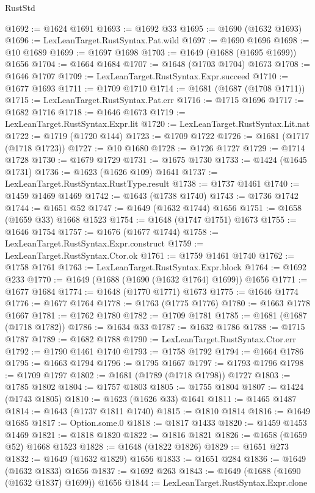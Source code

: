 \begin{lexlean}{RustStd}
\begin{coremodule}
{\begin{coremodule}
{{{{{{{{{{{{{{{{{{{{{{{{{{{{{{{{{{{{{{{{{{{{@1692 := @1624 @1691
@1693 := @1692 @33
@1695 := @1690 (@1632 @1693)
@1696 := LexLeanTarget.RustSyntax.Pat.wild
@1697 := @1690 @1696
@1698 := @10 @1689
@1699 := @1697 @1698
@1703 := @1649 (@1688 (@1695 @1699)) @1656
@1704 := @1664 @1684
@1707 := @1648 (@1703 @1704) @1673
@1708 := @1646 @1707
@1709 := LexLeanTarget.RustSyntax.Expr.succeed
@1710 := @1677 @1693
@1711 := @1709 @1710
@1714 := @1681 (@1687 (@1708 @1711))
@1715 := LexLeanTarget.RustSyntax.Pat.err
@1716 := @1715 @1696
@1717 := @1682 @1716
@1718 := @1646 @1673
@1719 := LexLeanTarget.RustSyntax.Expr.lit
@1720 := LexLeanTarget.RustSyntax.Lit.nat
@1722 := @1719 (@1720 @144)
@1723 := @1709 @1722
@1726 := @1681 (@1717 (@1718 @1723))
@1727 := @10 @1680
@1728 := @1726 @1727
@1729 := @1714 @1728
@1730 := @1679 @1729
@1731 := @1675 @1730
@1733 := @1424 (@1645 @1731)
@1736 := @1623 (@1626 @109) @1641
@1737 := LexLeanTarget.RustSyntax.RustType.result
@1738 := @1737 @1461
@1740 := @1459 @1469 @1469
@1742 := @1643 (@1738 @1740)
@1743 := @1736 @1742
@1744 := @1651 @52
@1747 := @1649 (@1632 @1744) @1656
@1751 := @1658 (@1659 @33) @1668 @1523
@1754 := @1648 (@1747 @1751) @1673
@1755 := @1646 @1754
@1757 := @1676 (@1677 @1744)
@1758 := LexLeanTarget.RustSyntax.Expr.construct
@1759 := LexLeanTarget.RustSyntax.Ctor.ok
@1761 := @1759 @1461 @1740
@1762 := @1758 @1761
@1763 := LexLeanTarget.RustSyntax.Expr.block
@1764 := @1692 @233
@1770 := @1649 (@1688 (@1690 (@1632 @1764) @1699)) @1656
@1771 := @1677 @1684
@1774 := @1648 (@1770 @1771) @1673
@1775 := @1646 @1774
@1776 := @1677 @1764
@1778 := @1763 (@1775 @1776)
@1780 := @1663 @1778 @1667
@1781 := @1762 @1780
@1782 := @1709 @1781
@1785 := @1681 (@1687 (@1718 @1782))
@1786 := @1634 @33
@1787 := @1632 @1786
@1788 := @1715 @1787
@1789 := @1682 @1788
@1790 := LexLeanTarget.RustSyntax.Ctor.err
@1792 := @1790 @1461 @1740
@1793 := @1758 @1792
@1794 := @1664 @1786
@1795 := @1663 @1794
@1796 := @1795 @1667
@1797 := @1793 @1796
@1798 := @1709 @1797
@1802 := @1681 (@1789 (@1718 @1798)) @1727
@1803 := @1785 @1802
@1804 := @1757 @1803
@1805 := @1755 @1804
@1807 := @1424 (@1743 @1805)
@1810 := @1623 (@1626 @33) @1641
@1811 := @1465 @1487
@1814 := @1643 (@1737 @1811 @1740)
@1815 := @1810 @1814
@1816 := @1649 @1685
@1817 := Option.some.{0}
@1818 := @1817 @1433
@1820 := @1459 @1453 @1469
@1821 := @1818 @1820
@1822 := @1816 @1821
@1826 := @1658 (@1659 @52) @1668 @1523
@1828 := @1648 (@1822 @1826)
@1829 := @1651 @273
@1832 := @1649 (@1632 @1829) @1656
@1833 := @1651 @284
@1836 := @1649 (@1632 @1833) @1656
@1837 := @1692 @263
@1843 := @1649 (@1688 (@1690 (@1632 @1837) @1699)) @1656
@1844 := LexLeanTarget.RustSyntax.Expr.clone
}}}}}}}}}}}}}}}}}}}}}}}}}}}}}}}}}}}}}}}}}}}}
\end{coremodule}}
\end{coremodule}
\end{lexlean}
